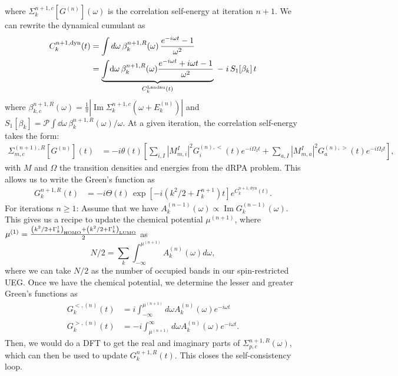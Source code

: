 where $\Sigma_k^{n+1,c}[G^{(n)}](\omega)$ is the correlation self-energy at iteration $n+1$.
We can rewrite the dynamical cumulant as 
\begin{align}
C_k^{n+1,\text{dyn}}(t) &= \int d\omega\, \beta_{k}^{n+1,R}(\omega)\,
\frac{e^{-i\omega t}-1}{\omega^{2}}\\
&= \underbrace{\int\!\dd\omega\,\beta_{k}^{n+1,R}(\omega)
    \frac{e^{-i\omega t}+i\omega t-1}{\omega^2}}_{C^{\rm Landau}_k(t)}
  \;-\; i\,S_1[\beta_k]\,t
\end{align}
where $\beta_{k,c}^{n+1,R}(\omega)=\frac{1}{\pi}\left|\operatorname{Im}\Sigma_k^{n+1,c}
\!\left(\omega+E_k^{(n)}\right)\right|$ and $S_1[\beta_k]=\mathcal{P} \int\!\dd\omega\,\beta_{k}^{n+1,R}(\omega)/\omega$. At a given iteration, the correlation self-energy takes the form:
\begin{align}
\Sigma_{m, c}^{(n+1),R}[G^{(n)}](t) &= -i\theta(t)\left[\sum_{i, I}\left|M_{ m,i}^I\right|^2 G^{(n),<}_{i}(t) e^{-i\Omega_I t} + \sum_{a, I}\left|M_{ m,a}^I\right|^2 G^{(n),>}_{a}(t) e^{-i\Omega_I t}\right],
\label{eq:correlation_self_energy_gw}
\end{align}
with $M$ and $\Omega$ the transition densities and energies from the dRPA problem. 
This allows us to write the Green's function as 
\begin{align}
G_k^{n+1,R}(t) &= - i\Theta(t)\, \exp\left[-i \left(k^2/2+\Gamma_k^{n+1}\right) t \right] e^{C_k^{n+1,\text{dyn}}(t)}.
\end{align}For iterations $n \geq 1$: Assume that we have $A_k^{(n-1)}(\omega)\propto \operatorname{Im}
G_k^{(n-1)}(\omega)$. 
This gives us a recipe to update the chemical potential $\mu^{(n+1)}$, where $\mu^{(1)}=\frac{\left(k^2/2 + \Gamma^1_k\right)_{\rm HOMO}+\left(k^2/2 + \Gamma^1_k\right)_{\rm LUMO}}{2}$ as
\begin{equation}
    N/2 = \sum_k \int_{-\infty}^{\mu^{(n+1)}} A_k^{(n)}(\omega) d \omega,
\end{equation}
where we can take $N/2$ as the number of occupied bands in our spin-restricted UEG. Once we have the chemical potential, we determine the lesser and greater Green's functions as 
\begin{align}
    G_k^{<,(n)}(t)&=i \int_{-\infty}^{\mu^{(n+1)}} d \omega A_k^{(n)}(\omega) e^{-i \omega t} \\
    G_k^{>,(n)}(t)&=-i \int_{\mu^{(n+1)}}^{\infty} d \omega A_k^{(n)}(\omega) e^{-i \omega t} .
\end{align}
Then, we would do a DFT to get the real and imaginary parts of $\Sigma_{p, c}^{n+1,R}(\omega)$, which can then be used to update $G_k^{n+1,R}(t)$. This closes the self-consistency loop.
